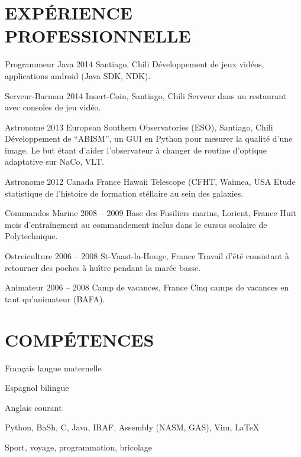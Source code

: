 \documentclass[paper=a4, fontsize=11pt, french]{old_school}	 			%
\newcommand{\NewPart}[1]{\section*{\uppercase{#1}}}
\begin{document}
\NewPart{Expérience Professionnelle}{}
\begin{joblist}
\item[Programmeur Java]{2014}
	{Santiago, Chili}
	{Développement de jeux vidéos, applications android (Java SDK, NDK).}


\item[Serveur-Barman]{2014}
	{Insert-Coin, Santiago, Chili}
	{Serveur dans un restaurant avec consoles de jeu vidéo.}


\item[Astronome]{2013}
	{European Southern Observatories (ESO), Santiago, Chili}
	{Développement de ``ABISM'', un GUI en Python pour mesurer la qualité d'une image.
 	Le but étant d'aider l'observateur à changer de routine d'optique adaptative sur NaCo, VLT.}


\item[Astronome]{2012}
	{Canada France Hawaii Telescope (CFHT, Waimea, USA}
	{Etude statistique de l'histoire de formation stéllaire au sein des galaxies.}


\item[Commandos Marine]{2008 -- 2009}
	{Base des Fusiliers marins, Lorient, France}
	{Huit mois d'entraînement au commandement inclus dans le cursus scolaire de Polytechnique.}


\item[Ostreiculture]{2006 -- 2008}
	{St-Vaast-la-Houge, France}
	{Travail d'été consistant à retourner des poches à huître pendant la marée basse.}


\item[Animateur]{2006 -- 2008}
	{Camp de vacances, France}
	{Cinq camps de vacances en tant qu'animateur (BAFA).}

\end{joblist}



\NewPart{Compétences}{}


\begin{languagelist}
\item{Français}	{langue maternelle}
\item{Espagnol}	{bilingue}
\item{Anglais}	{courant} 
\end{languagelist}

		Python, 
		BaSh, 
		C, 
		Java,
		IRAF, 
		Assembly (NASM, GAS), 
		Vim, 
		\LaTeX

	Sport, voyage, programmation, bricolage
\end{document}
